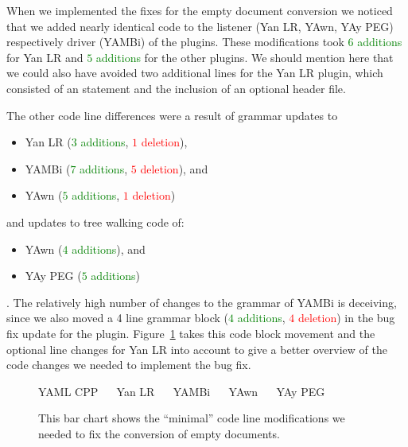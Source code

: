 \begin{sloppypar}
When we implemented the fixes for the empty document conversion we noticed that we added nearly identical code to the listener (Yan LR, YAwn, YAy PEG) respectively driver (YAMBi) of the plugins. These modifications took \textcolor{Green}{$6$ additions} for Yan LR and \textcolor{Green}{$5$ additions} for the other plugins. We should mention here that we could also have avoided two additional lines for the Yan LR plugin, which consisted of an  statement and the inclusion of an optional header file.
\end{sloppypar}

The other code line differences were a result of grammar updates to

\begin{itemize}
  \item Yan LR (\textcolor{Green}{$3$ additions}, \textcolor{Red}{$1$ deletion}),
  \item YAMBi (\textcolor{Green}{$7$ additions}, \textcolor{Red}{$5$ deletion}), and
  \item YAwn (\textcolor{Green}{$5$ additions}, \textcolor{Red}{$1$ deletion})
\end{itemize}

and updates to tree walking code of:

\begin{itemize}
  \item YAwn (\textcolor{Green}{$4$ additions}), and
  \item YAy PEG (\textcolor{Green}{$5$ additions})
\end{itemize}

. The relatively high number of changes to the grammar of YAMBi is deceiving, since we also moved a 4 line grammar block (\textcolor{Green}{$4$ additions}, \textcolor{Red}{$4$ deletion}) in the bug fix update for the plugin. Figure~\ref{fig:empty_document_minimum_count} takes this code block movement and the optional line changes for Yan LR into account to give a better overview of the code changes we needed to implement the bug fix.

\begin{figure}[H]
  \begin{bchart}[max=20, width=0.8\textwidth, unit={~Lines of Code}]
  \end{bchart}
  \begin{center}
  \vspace{-0.5cm}
     YAML CPP ~~
     Yan LR ~~
     YAMBi ~~
     YAwn ~~
     YAy PEG
  \vspace{-0.5cm}
  \end{center}
  \caption{This bar chart shows the “minimal” code line modifications we needed to fix the conversion of empty documents.}
  \label{fig:empty_document_minimum_count}
\end{figure}

